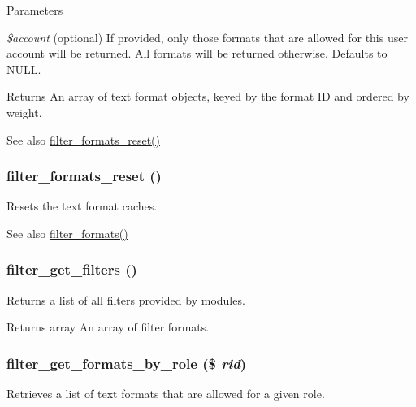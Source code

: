 \begin{DoxyParams}{Parameters}
\item[{\em \$account}](optional) If provided, only those formats that are allowed for this user account will be returned. All formats will be returned otherwise. Defaults to NULL.\end{DoxyParams}
\begin{DoxyReturn}{Returns}
An array of text format objects, keyed by the format ID and ordered by weight.
\end{DoxyReturn}
\begin{DoxySeeAlso}{See also}
\hyperlink{filter_8module_a01762171df5ab9dcbbcd6eb47013f681}{filter\_\-formats\_\-reset()} 
\end{DoxySeeAlso}
\hypertarget{filter_8module_a01762171df5ab9dcbbcd6eb47013f681}{
\subsubsection[{filter\_\-formats\_\-reset}]{\setlength{\rightskip}{0pt plus 5cm}filter\_\-formats\_\-reset ()}}
\label{filter_8module_a01762171df5ab9dcbbcd6eb47013f681}
Resets the text format caches.

\begin{DoxySeeAlso}{See also}
\hyperlink{filter_8module_a9768cd98262e5de87ebcc1b2bb507b7b}{filter\_\-formats()} 
\end{DoxySeeAlso}
\hypertarget{filter_8module_a9a4d34bbacb92f82ae844fefbd20d32d}{
\subsubsection[{filter\_\-get\_\-filters}]{\setlength{\rightskip}{0pt plus 5cm}filter\_\-get\_\-filters ()}}
\label{filter_8module_a9a4d34bbacb92f82ae844fefbd20d32d}
Returns a list of all filters provided by modules.

\begin{DoxyReturn}{Returns}
array An array of filter formats. 
\end{DoxyReturn}
\hypertarget{filter_8module_a3df4b9ad5e508bd13115b77401c56285}{
\subsubsection[{filter\_\-get\_\-formats\_\-by\_\-role}]{\setlength{\rightskip}{0pt plus 5cm}filter\_\-get\_\-formats\_\-by\_\-role (\$ {\em rid})}}
\label{filter_8module_a3df4b9ad5e508bd13115b77401c56285}
Retrieves a list of text formats that are allowed for a given role.



